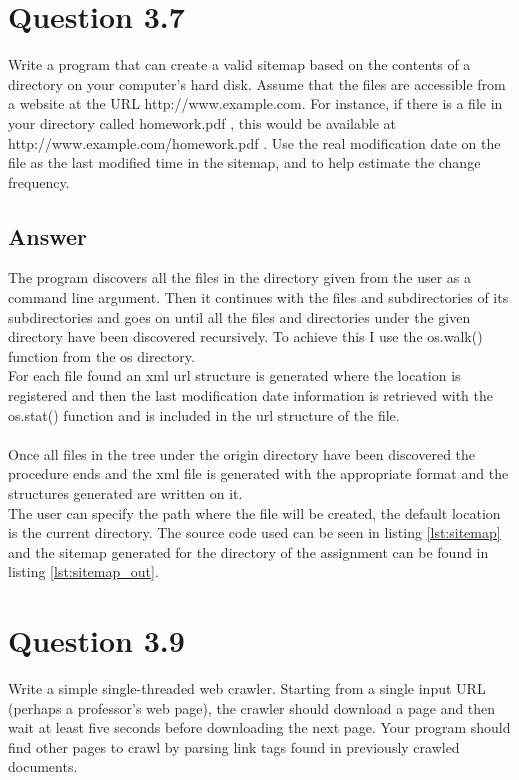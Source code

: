 \documentclass{article}
\begin{document}
\section*{Question 3.7}
Write a program that can create a valid sitemap based on the contents of a directory on your computer’s hard disk. Assume that the files are accessible from a website at the URL http://www.example.com. For instance, if there is a file in your directory called homework.pdf , this would be available at http://www.example.com/homework.pdf . Use the real modification date on the file as the last modified time in the sitemap, and to help estimate the change frequency.
\subsection*{Answer}
The program discovers all the files in the directory given from the user as a command line argument. Then it continues with the files and subdirectories of its subdirectories and goes on until all the files and directories under the given directory have been discovered recursively. To achieve this I use the os.walk() function from the os directory. \\For each file found an xml url structure is generated where the location is registered and then the last modification date information is retrieved with the os.stat() function and is included in the url structure of the file.\\ 
\\Once all files in the tree under the origin directory have been discovered the procedure ends and the xml file is generated with the appropriate format and the structures generated are written on it. \\The user can specify the path where the file will be created, the default location is the current directory.
The source code used can be seen in listing \ref{lst:sitemap} and the sitemap generated for the directory of the assignment can be found in listing \ref{lst:sitemap_out}.\\


\section*{Question 3.9}
Write a simple single-threaded web crawler. Starting from a single input URL
(perhaps a professor’s web page), the crawler should download a page and then
wait at least five seconds before downloading the next page. Your program should
find other pages to crawl by parsing link tags found in previously crawled documents.
\end{document}
